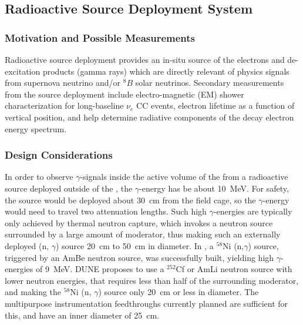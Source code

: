 \subsection{Radioactive Source Deployment System}\label{sec:rs}

\subsubsection{Motivation and Possible Measurements}

Radioactive source deployment provides an in-situ source of the electrons and de-excitation products (gamma rays) which are directly relevant of physics signals from supernova neutrino and/or $^{8}B$ solar neutrinos. Secondary measurements from the source deployment include electro-magnetic (EM) shower characterization for long-baseline $\nu_e$ CC events, electron lifetime as a function of %
 vertical position, and help determine radiative components of the decay electron energy spectrum.

\subsubsection{Design Considerations} 

In order to %
observe $\gamma$-signals inside the active volume of the  from a radioactive source deployed outside of the , the $\gamma$-energy has be about \SI{10}{\MeV}. For safety, the source would be deployed about \SI{30}{\cm} from the field cage, so the  $\gamma$-energy would need to travel two attenuation lengths. Such high $\gamma$-energies are typically only achieved by thermal neutron capture, which invokes a neutron source surrounded by a large amount of moderator, thus making such an externally deployed (n, $\gamma$) source \SI{20}{\cm}  to \SI{50}{\cm} %
in diameter. In \cite{bib:Triumf:Nickelsource}, a $^{58}$Ni (n,$\gamma$) source, triggered by an AmBe neutron source, was successfully built, yielding high $\gamma$-energies of \SI{9}{\MeV}. DUNE %
proposes to use a $^{252}$Cf or AmLi neutron source with lower neutron energies, that requires less than half of the surrounding moderator, and making the $^{58}$Ni (n, $\gamma$) source only \SI{20}{\cm} or less in diameter. The multipurpose instrumentation feedthroughs currently planned are sufficient for this, and have an inner diameter of \SI{25}{\cm}.

